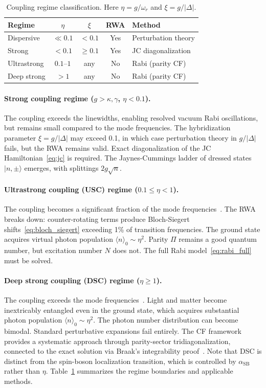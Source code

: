 \documentclass[reprint, floatfix, superscriptaddress, amsmath, amssymb, longbibliography]{revtex4-2}
\begin{document}
\begin{table}[t]
\centering
\caption{Coupling regime classification. Here $\eta = g/\omega_r$ and $\xi = g/|\Delta|$.}
\label{tab:regimes}
\begin{tabular}{lcccl}
\hline\hline
Regime & $\eta$ & $\xi$ & RWA & Method \\
\hline
Dispersive & $\ll 0.1$ & $< 0.1$ & Yes & Perturbation theory \\
Strong & $< 0.1$ & $\geq 0.1$ & Yes & JC diagonalization \\
Ultrastrong & $0.1$--$1$ & any & No & Rabi (parity CF) \\
Deep strong & $> 1$ & any & No & Rabi (parity CF) \\
\hline\hline
\end{tabular}
\end{table}

\paragraph{Strong coupling regime ($g > \kappa, \gamma$, $\eta < 0.1$).} The coupling exceeds the linewidths, enabling resolved vacuum Rabi oscillations, but remains small compared to the mode frequencies. The hybridization parameter $\xi = g/|\Delta|$ may exceed 0.1, in which case perturbation theory in $g/|\Delta|$ fails, but the RWA remains valid. Exact diagonalization of the JC Hamiltonian~\eqref{eq:jc} is required. The Jaynes-Cummings ladder of dressed states $|n,\pm\rangle$ emerges, with splittings $2g\sqrt{n}$.

\paragraph{Ultrastrong coupling (USC) regime ($0.1 \leq \eta < 1$).} The coupling becomes a significant fraction of the mode frequencies~\cite{Kockum2019, FornDiaz2019}. The RWA breaks down: counter-rotating terms produce Bloch-Siegert shifts~\eqref{eq:bloch_siegert} exceeding 1\% of transition frequencies. The ground state acquires virtual photon population $\langle n \rangle_0 \sim \eta^2$. Parity $\Pi$ remains a good quantum number, but excitation number $N$ does not. The full Rabi model~\eqref{eq:rabi_full} must be solved.

\paragraph{Deep strong coupling (DSC) regime ($\eta \geq 1$).} The coupling exceeds the mode frequencies~\cite{Casanova2010}. Light and matter become inextricably entangled even in the ground state, which acquires substantial photon population $\langle n \rangle_0 \sim \eta^2$. The photon number distribution can become bimodal. Standard perturbative expansions fail entirely. The CF framework provides a systematic approach through parity-sector tridiagonalization, connected to the exact solution via Braak's integrability proof~\cite{Braak2011}. Note that DSC is distinct from the spin-boson localization transition, which is controlled by $\alpha_{\mathrm{SB}}$ rather than $\eta$. Table~\ref{tab:regimes} summarizes the regime boundaries and applicable methods.
\end{document}
